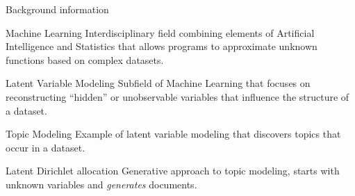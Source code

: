 \documentclass{beamer}
\begin{document}
  \begin{frame}{Background information}

    \onslide<+->
    \begin{block}{Machine Learning}
      Interdisciplinary field combining
      elements of Artificial Intelligence and Statistics that allows
      programs to approximate unknown functions based on complex datasets.
    \end{block}

    \onslide<+->
    \begin{block}{Latent Variable Modeling}
      Subfield of Machine Learning that focuses on reconstructing
      ``hidden'' or unobservable variables that influence the structure of
      a dataset.
    \end{block}

    \onslide<+->
    \begin{block}{Topic Modeling}
      Example of latent variable modeling that discovers \alert{topics}
      that occur in a dataset.
    \end{block}

    \onslide<+->
    \begin{block}{Latent Dirichlet allocation}
      Generative approach to topic modeling, starts with unknown variables
      and \emph{generates} documents.
    \end{block}
  \end{frame}
\end{document}
